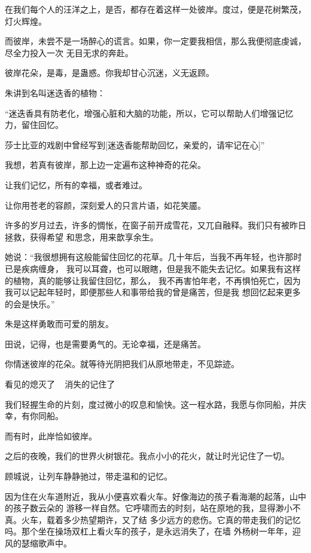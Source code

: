 		在我们每个人的汪洋之上，是否，都存在着这样一处彼岸。度过，便是花树繁茂，灯火辉煌。

		而彼岸，未尝不是一场醉心的谎言。如果，你一定要我相信，那么我便彻底虔诚，尽全力投入一次
	无目无求的奔赴。

		彼岸花朵，是毒，是蛊惑。你我却甘心沉迷，义无返顾。

		朱讲到名叫迷迭香的植物：

		“迷迭香具有防老化，增强心脏和大脑的功能，所以，它可以帮助人们增强记忆力，留住回忆。

		莎士比亚的戏剧中曾经写到[迷迭香能帮助回忆，亲爱的，请牢记在心]”


		我想，若真有彼岸，那上边一定遍布这种神奇的花朵。

		让我们记忆，所有的幸福，或者难过。

		让你用苍老的容颜，深刻爱人的只言片语，如花笑靥。

		许多的岁月过去，许多的惆怅，在窗子前开成雪花，又兀自融释。我们只有被昨日拯救，获得希望
	和思念，用来歆享余生。

		她说：“我很想拥有这般能留住回忆的花草。几十年后，当我不再年轻，也许那时已是疾病缠身，
	我可以耳聋，也可以眼瞎，但是我不能失去记忆。如果我有这样的植物，真的能够让我留住回忆，那么，
	我不再害怕年老，不再惧怕死亡，因为我可以记起年轻时，即便那些人和事带给我的曾是痛苦，但是我
	想回忆起来更多的会是快乐。”

		朱是这样勇敢而可爱的朋友。

		田说，记得，也是需要勇气的。无论幸福，还是痛苦。

		你情迷彼岸的花朵。就等待光阴把我们从原地带走，不见踪迹。

		看见的熄灭了 ~ 消失的记住了

		我们轻握生命的片刻，度过微小的叹息和愉快。这一程水路，我愿与你同船，并庆幸，有你同船。

		而有时，此岸恰如彼岸。

	\endwriting



		之后的夜晚，我们的世界火树银花。我点小小的花火，就让时光记住了一切。

		顾城说，让列车静静驰过，带走温和的记忆。

		因为住在火车道附近，我从小便喜欢看火车。好像海边的孩子看海潮的起落，山中的孩子数云朵的
	游移一样自然。它呼啸而去的时刻，站在原地的我，显得渺小不真。火车，载着多少热望期许，又了结
	多少远方的悲伤。它真的带走我们的记忆吗。那个坐在操场双杠上看火车的孩子，是永远消失了，在墙
	外杨树一年年，迎风的瑟缩歌声中。



